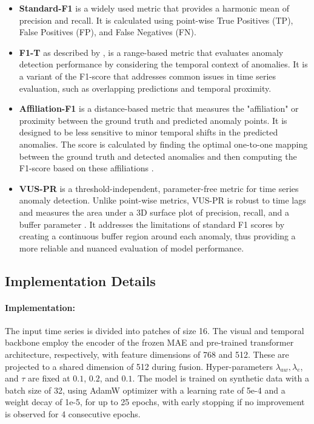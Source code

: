 \documentclass{article}
\theoremstyle{plain}
\theoremstyle{definition}
\theoremstyle{remark}
\begin{document}
\begin{itemize}

\item \textbf{Standard-F1} is a widely used metric that provides a harmonic mean of precision and recall. It is calculated using point-wise True Positives (TP), False Positives (FP), and False Negatives (FN).
\item \textbf{F1-T} as described by \cite{sarfraz2024position}, is a range-based metric that evaluates anomaly detection performance by considering the temporal context of anomalies. It is a variant of the F1-score that addresses common issues in time series evaluation, such as overlapping predictions and temporal proximity.
\item \textbf{Affiliation-F1} is a distance-based metric that measures the "affiliation" or proximity between the ground truth and predicted anomaly points. It is designed to be less sensitive to minor temporal shifts in the predicted anomalies. The score is calculated by finding the optimal one-to-one mapping between the ground truth and detected anomalies and then computing the F1-score based on these affiliations \citep{huet2022local}.
\item \textbf{VUS-PR} is a threshold-independent, parameter-free metric for time series anomaly detection. Unlike point-wise metrics, VUS-PR is robust to time lags and measures the area under a 3D surface plot of precision, recall, and a buffer parameter \citep{paparrizos2022volume}. It addresses the limitations of standard F1 scores by creating a continuous buffer region around each anomaly, thus providing a more reliable and nuanced evaluation of model performance.
\end{itemize}

\subsection{Implementation Details} \label{AppendixC4}

\paragraph{Implementation:}
The input time series is divided into patches of size 16. The visual and temporal backbone employ the encoder of the frozen MAE\cite{chen2024visionts} and pre-trained  transformer architecture\cite{lan2025foundationmodelszeroshottime}, respectively, with feature dimensions of 768 and 512. These are projected to a shared dimension of 512 during fusion. Hyper-parameters $\lambda_{aw}, \lambda_{e}$, and $\tau$ are fixed at $0.1$, $0.2$, and $0.1$. The model is trained on synthetic data \cite{lan2025foundationmodelszeroshottime} with a batch size of 32, using AdamW optimizer with a learning rate of 5e-4 and a weight decay of 1e-5, for up to 25 epochs, with early stopping if no improvement is observed for 4 consecutive epochs. 
\end{document}
